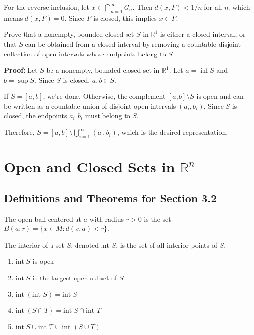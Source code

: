 For the reverse inclusion, let $x \in \bigcap_{n=1}^{\infty} G_n$. Then $d(x,F) < 1/n$ for all $n$, which means $d(x,F) = 0$. Since $F$ is closed, this implies $x \in F$.

\begin{problembox}
Prove that a nonempty, bounded closed set $S$ in $\mathbb{R}^1$ is either a closed interval, or that $S$ can be obtained from a closed interval by removing a countable disjoint collection of open intervals whose endpoints belong to $S$.
\end{problembox}

\textbf{Proof:} Let $S$ be a nonempty, bounded closed set in $\mathbb{R}^1$. Let $a = \inf S$ and $b = \sup S$. Since $S$ is closed, $a, b \in S$.

If $S = [a,b]$, we're done. Otherwise, the complement $[a,b] \setminus S$ is open and can be written as a countable union of disjoint open intervals $(a_i, b_i)$. Since $S$ is closed, the endpoints $a_i, b_i$ must belong to $S$.

Therefore, $S = [a,b] \setminus \bigcup_{i=1}^{\infty} (a_i, b_i)$, which is the desired representation.

\section{Open and Closed Sets in $\mathbb{R}^n$}

\subsection*{Definitions and Theorems for Section 3.2}

\begin{definition}
The open ball centered at $a$ with radius $r > 0$ is the set $B(a;r) = \{x \in M : d(x,a) < r\}$.
\end{definition}

\begin{definition}[Interior]
The interior of a set $S$, denoted $\text{int } S$, is the set of all interior points of $S$.
\end{definition}

\begin{theorem}
\begin{enumerate}
\item $\text{int } S$ is open
\item $\text{int } S$ is the largest open subset of $S$
\item $\text{int }(\text{int } S) = \text{int } S$
\item $\text{int }(S \cap T) = \text{int } S \cap \text{int } T$
\item $\text{int } S \cup \text{int } T \subseteq \text{int }(S \cup T)$
\end{enumerate}
\end{theorem}

